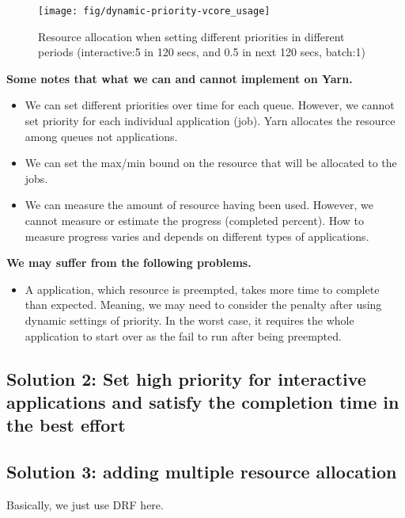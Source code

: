 \begin{figure}
	\centering
	\texttt{[image: fig/dynamic-priority-vcore\_usage]}
	\caption{Resource allocation when setting different priorities in different periods (interactive:5 in 120 secs, and 0.5 in next 120 secs, batch:1) }
	\label{fig:dynamic}
\end{figure}

\textbf{Some notes that what we can and cannot implement on Yarn.}

\begin{itemize}
	\item We can set different priorities over time for each queue.	However, we cannot set priority for each individual application (job). Yarn allocates the resource among queues not applications.
	\item We can set the max/min bound on the resource that will be allocated to the jobs.
	\item We can measure the amount of resource having been used. However, we cannot measure or estimate the progress (completed percent). How to measure progress varies and depends on different types of applications.
\end{itemize}

\textbf{We may suffer from the following problems.}

\begin{itemize}
	\item A application, which resource is preempted, takes more time to complete than expected. Meaning, we may need to consider the penalty after using dynamic settings of priority. In the worst case, it requires the whole application to start over as the fail to run after being preempted.
\end{itemize}


\subsection{Solution 2: Set high priority for interactive applications and satisfy the completion time in the best effort}


\subsection{Solution 3: adding multiple resource allocation}

Basically, we just use DRF here.

